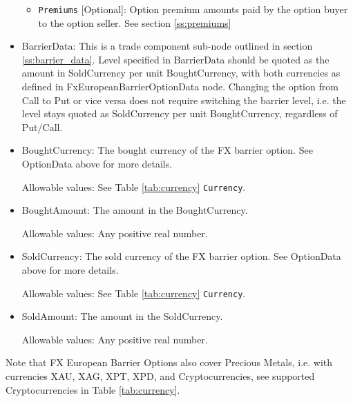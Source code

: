 \begin{itemize}
\begin{itemize}
\item \lstinline!Premiums! [Optional]: Option premium amounts paid by the option buyer to the option seller. See section \ref{ss:premiums}

\end{itemize}





\item BarrierData: This is a trade component sub-node outlined in section \ref{ss:barrier_data}.
Level specified in BarrierData should be quoted as the amount in SoldCurrency per unit BoughtCurrency, with both currencies as defined in FxEuropeanBarrierOptionData node.
Changing the option from Call to Put or vice versa does not require switching the barrier level, i.e. the level stays quoted as SoldCurrency per unit BoughtCurrency, regardless of Put/Call.

\item BoughtCurrency: The bought currency of the FX barrier option. See OptionData above for more details.

Allowable values:  See Table \ref{tab:currency} \lstinline!Currency!.

\item BoughtAmount: The amount in the BoughtCurrency.  

Allowable values:  Any positive real number.

\item SoldCurrency: The sold currency of the FX barrier option. See OptionData above for more details.

Allowable values:  See Table \ref{tab:currency} \lstinline!Currency!.

\item SoldAmount: The amount in the SoldCurrency.  

Allowable values:  Any positive real number.

\end{itemize}

Note that FX European Barrier Options also cover Precious Metals, i.e. with
currencies XAU, XAG, XPT, XPD, and Cryptocurrencies,  see supported Cryptocurrencies in Table \ref{tab:currency}.
